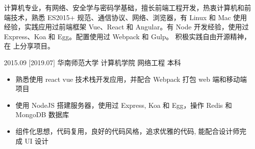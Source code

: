 \documentclass[zh]{resume}
\begin{document}
\makeheader

{\onehalfspacing\hspace{2em}%
计算机专业，有网络、安全学与密码学基础，擅长前端工程开发，热衷计算机和前端技术，熟悉 ES2015+ 规范、通信协议、网络、浏览器，有 Linux 和 Mac 使用经验，实践应用过前端框架 Vue、React 和 Angular。有 Node 开发经验，使用过 Express、Koa 和 Egg。配置使用过 Webpack 和 Gulp。
积极实践自由开源精神，在  上分享项目。
\par}

\begin{competences}
\end{competences}

\begin{educations}
  \education%
    {2015.09}%
    [2019.07]%
    {华南师范大学}%
    {计算机学院}%
    {网络工程}%
    {本科}
\end{educations}

\begin{itemize}
  \item 熟悉使用 react vue 技术栈开发应用，并配合 Webpack 打包 web 端和移动端项目
  \item 使用 NodeJS 搭建服务器，使用过 Express, Koa 和 Egg，操作 Redis 和 MongoDB 数据库
  \item 组件化思想，代码复用，良好的代码风格，追求优雅的代码, 能配合设计师完成 UI 设计
\end{itemize}
\end{document}
